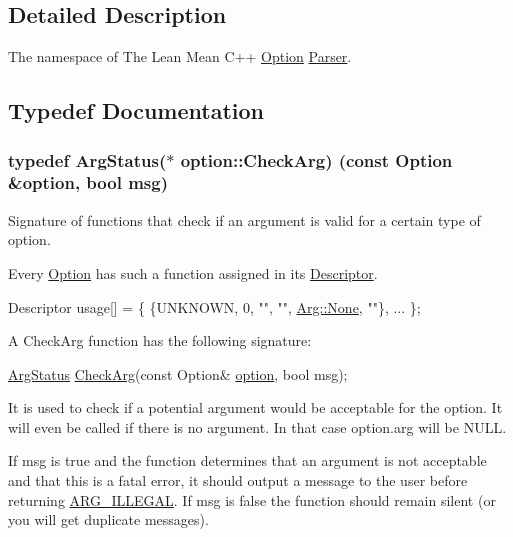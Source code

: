 \subsection{Detailed Description}
The namespace of The Lean Mean C++ \hyperlink{classoption_1_1Option}{Option} \hyperlink{classoption_1_1Parser}{Parser}. 

\subsection{Typedef Documentation}
\subsubsection[{\texorpdfstring{Check\+Arg}{CheckArg}}]{\setlength{\rightskip}{0pt plus 5cm}typedef {\bf Arg\+Status}($\ast$ option\+::\+Check\+Arg) (const {\bf Option} \&option, bool msg)}\hypertarget{namespaceoption_a4cdf403efae65e18bf850e2001b12a2a}{}\label{namespaceoption_a4cdf403efae65e18bf850e2001b12a2a}


Signature of functions that check if an argument is valid for a certain type of option. 

Every \hyperlink{classoption_1_1Option}{Option} has such a function assigned in its \hyperlink{structoption_1_1Descriptor}{Descriptor}. 
\begin{DoxyCode}
Descriptor usage[] = \{ \{UNKNOWN, 0, \textcolor{stringliteral}{""}, \textcolor{stringliteral}{""}, \hyperlink{structoption_1_1Arg_a7fc01987899c91c6b6a1be5711a46e22}{Arg::None}, \textcolor{stringliteral}{""}\}, ... \};
\end{DoxyCode}


A Check\+Arg function has the following signature\+: 
\begin{DoxyCode}
\hyperlink{namespaceoption_aee8c76a07877335762631491e7a5a1a9}{ArgStatus} \hyperlink{namespaceoption_a4cdf403efae65e18bf850e2001b12a2a}{CheckArg}(\textcolor{keyword}{const} Option& \hyperlink{namespaceoption}{option}, \textcolor{keywordtype}{bool} msg); 
\end{DoxyCode}


It is used to check if a potential argument would be acceptable for the option. It will even be called if there is no argument. In that case {\ttfamily option.\+arg} will be {\ttfamily N\+U\+LL}.

If {\ttfamily msg} is {\ttfamily true} and the function determines that an argument is not acceptable and that this is a fatal error, it should output a message to the user before returning \hyperlink{namespaceoption_aee8c76a07877335762631491e7a5a1a9a9528e32563b795bd2930b12d0a5e382d}{A\+R\+G\+\_\+\+I\+L\+L\+E\+G\+AL}. If {\ttfamily msg} is {\ttfamily false} the function should remain silent (or you will get duplicate messages).

